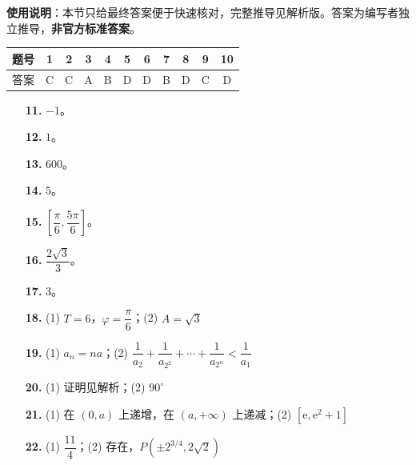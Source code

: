 
\begin{gknotice}
\textbf{使用说明}：本节只给最终答案便于快速核对，完整推导见解析版。答案为编写者独立推导，\textbf{非官方标准答案}。
\end{gknotice}

\begin{center}\begin{tabular}{ccccccccccc}
\toprule
题号 & 1 & 2 & 3 & 4 & 5 & 6 & 7 & 8 & 9 & 10 \\
\midrule
答案 & C & C & A & B & D & D & B & D & C & D \\
\bottomrule
\end{tabular}\end{center}

\begin{itemize}[leftmargin=2.6em]
  \item[\textbf{11.}] $-1$。
  \item[\textbf{12.}] $1$。
  \item[\textbf{13.}] $600$。
  \item[\textbf{14.}] $5$。
  \item[\textbf{15.}] $\left[\dfrac\pi6,\dfrac{5\pi}6\right]$。
  \item[\textbf{16.}] $\dfrac{2\sqrt3}3$。
  \item[\textbf{17.}] $3$。
\end{itemize}

\begin{itemize}[leftmargin=2.6em]
  \item[\textbf{18.}] (1) $T=6$，$\varphi=\dfrac\pi6$；(2) $A=\sqrt3$
  \item[\textbf{19.}] (1) $a_n=na$；(2) $\dfrac1{a_2}+\dfrac1{a_{2^2}}+\cdots+\dfrac1{a_{2^n}}<\dfrac1{a_1}$
  \item[\textbf{20.}] (1) 证明见解析；(2) $90^\circ$
  \item[\textbf{21.}] (1) 在 $(0,a)$ 上递增，在 $(a,+\infty)$ 上递减；(2) $[\mathrm e,\mathrm e^2+1]$
  \item[\textbf{22.}] (1) $\dfrac{11}4$；(2) 存在，$P\left(\pm2^{3/4},2\sqrt2\right)$
\end{itemize}
